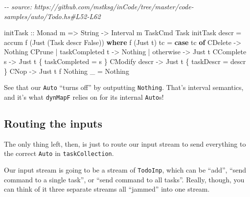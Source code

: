 \documentclass[]{article}
\newenvironment{Shaded}{}{}
\newcommand{\CommentTok}[1]{\textcolor[rgb]{0.38,0.63,0.69}{\textit{#1}}}
\newcommand{\DataTypeTok}[1]{\textcolor[rgb]{0.56,0.13,0.00}{#1}}
\newcommand{\FunctionTok}[1]{\textcolor[rgb]{0.02,0.16,0.49}{#1}}
\newcommand{\KeywordTok}[1]{\textcolor[rgb]{0.00,0.44,0.13}{\textbf{#1}}}
\newcommand{\NormalTok}[1]{#1}
\newcommand{\OperatorTok}[1]{\textcolor[rgb]{0.40,0.40,0.40}{#1}}
\newcommand{\OtherTok}[1]{\textcolor[rgb]{0.00,0.44,0.13}{#1}}
\begin{document}
\begin{Shaded}
\begin{Highlighting}[]
\CommentTok{{-}{-} source: https://github.com/mstksg/inCode/tree/master/code{-}samples/auto/Todo.hs\#L52{-}L62}

\OtherTok{initTask ::} \DataTypeTok{Monad}\NormalTok{ m }\OtherTok{=>} \DataTypeTok{String} \OtherTok{{-}>} \DataTypeTok{Interval}\NormalTok{ m }\DataTypeTok{TaskCmd} \DataTypeTok{Task}
\NormalTok{initTask descr }\OtherTok{=}\NormalTok{ accum f (}\DataTypeTok{Just}\NormalTok{ (}\DataTypeTok{Task}\NormalTok{ descr }\DataTypeTok{False}\NormalTok{))}
  \KeywordTok{where}
\NormalTok{    f (}\DataTypeTok{Just}\NormalTok{ t) tc }\OtherTok{=} \KeywordTok{case}\NormalTok{ tc }\KeywordTok{of}
                      \DataTypeTok{CDelete}                  \OtherTok{{-}>} \DataTypeTok{Nothing}
                      \DataTypeTok{CPrune} \OperatorTok{|}\NormalTok{ taskCompleted t }\OtherTok{{-}>} \DataTypeTok{Nothing}
                             \OperatorTok{|} \FunctionTok{otherwise}       \OtherTok{{-}>} \DataTypeTok{Just}\NormalTok{ t}
                      \DataTypeTok{CComplete}\NormalTok{ s              }\OtherTok{{-}>} \DataTypeTok{Just}\NormalTok{ t \{ taskCompleted }\OtherTok{=}\NormalTok{ s \}}
                      \DataTypeTok{CModify}\NormalTok{ descr            }\OtherTok{{-}>} \DataTypeTok{Just}\NormalTok{ t \{ taskDescr }\OtherTok{=}\NormalTok{ descr \}}
                      \DataTypeTok{CNop}                     \OtherTok{{-}>} \DataTypeTok{Just}\NormalTok{ t}
\NormalTok{    f }\DataTypeTok{Nothing}\NormalTok{ \_   }\OtherTok{=} \DataTypeTok{Nothing}
\end{Highlighting}
\end{Shaded}

See that our \texttt{Auto} ``turns off'' by outputting \texttt{Nothing}. That's
interval semantics, and it's what \texttt{dynMapF} relies on for its internal
\texttt{Auto}s!

\hypertarget{routing-the-inputs}{%
\subsection{Routing the inputs}\label{routing-the-inputs}}

The only thing left, then, is just to route our input stream to send everything
to the correct \texttt{Auto} in \texttt{taskCollection}.

Our input stream is going to be a stream of \texttt{TodoInp}, which can be
``add'', ``send command to a single task'', or ``send command to all tasks''.
Really, though, you can think of it three separate streams all ``jammed'' into
one stream.
\end{document}
